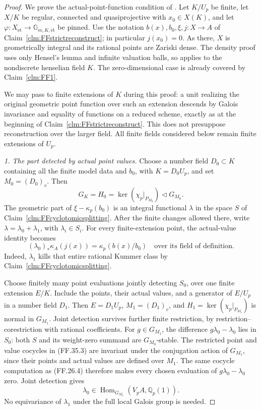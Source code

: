 \begin{proof}
We prove the actual-point-function condition of
\citet[Theorem~4.18(5)]{FF_CHW2024}. Let \(K/U_p\)
be finite, let \(X/K\) be regular, connected and
quasiprojective with \(x_0\in X(K)\), and let
\(\varphi:X_{\mathrm{\acute et}}\to
\mathbb G_{m,K,\mathrm{\acute et}}\) be pinned.
Use the notation \(b(x),b_0,\xi,j:X\to A\) of
Claim~\ref{clm:FFstrictreconstruct}; in particular
\(j(x_0)=0\). As there, \(X\) is geometrically
integral and its rational points are Zariski dense.
The density proof uses only Hensel's lemma and
infinite valuation balls, so applies to the
nondiscrete henselian field \(K\).
The zero-dimensional case is already covered by
Claim~\ref{clm:FF1}.

We may pass to finite extensions of \(K\) during
this proof: a unit realizing the original geometric
point function over such an extension descends by
Galois invariance and equality of functions on a
reduced scheme, exactly as at the beginning of
Claim~\ref{clm:FFstrictreconstruct}. This does not
presuppose reconstruction over the larger field.
All finite fields considered below remain finite
extensions of \(U_p\).

\emph{1. The part detected by actual point values.}
Choose a number field \(D_0\subset K\) containing
all the finite model data and \(b_0\), with
\(K=D_0U_p\), and set \(M_0=(D_0)_v\).
Then
\[
 G_K=H_0=\ker(\chi_p|_{P_{M_0}})
                  \triangleleft G_{M_0}.
                                                        \tag{FF.35.2}
\]
The geometric part of \(\xi-\kappa_p(b_0)\)
is an integral functional \(\lambda\) in the
space \(S\) of Claim~\ref{clm:FFcyclotomicsplitting}.
After the finite changes allowed there, write
\(\lambda=\lambda_0+\lambda_1\), with
\(\lambda_i\in S_i\). For every finite-extension
point, the actual-value identity becomes
\[
  (\lambda_0)_*\kappa_A(j(x))
                =\kappa_p(b(x)/b_0)
               \quad\text{over its field of definition}.
                                                        \tag{FF.35.3}
\]
Indeed, \(\lambda_1\) kills that entire rational
Kummer class by Claim~\ref{clm:FFcyclotomicsplitting}.

Choose finitely many point evaluations jointly
detecting \(S_0\), over one finite extension \(E/K\).
Include the points, their actual values, and a
generator of \(E/U_p\) in a number field \(D_1\).
Then \(E=D_1U_p\), \(M_1=(D_1)_v\), and
\(H_1=\ker(\chi_p|_{P_{M_1}})\) is normal in
\(G_{M_1}\). Joint detection survives further
finite restriction, by restriction--corestriction
with rational coefficients.
For \(g\in G_{M_1}\), the difference
\(g\lambda_0-\lambda_0\) lies in \(S_0\):
both \(S\) and its weight-zero summand are
\(G_{M_0}\)-stable. The restricted point and
value cocycles in (FF.35.3) are invariant under
the conjugation action of \(G_{M_1}\), since
their points and actual values are defined over
\(M_1\). The same cocycle computation as
(FF.26.4) therefore makes every chosen evaluation
of \(g\lambda_0-\lambda_0\) zero. Joint detection
gives
\[
                \lambda_0\in
             \operatorname{Hom}_{G_{M_1}}(V_pA,\mathbb Q_p(1)).
                                                        \tag{FF.35.4}
\]
No equivariance of \(\lambda_1\) under the full
local Galois group is needed.


\end{proof}
